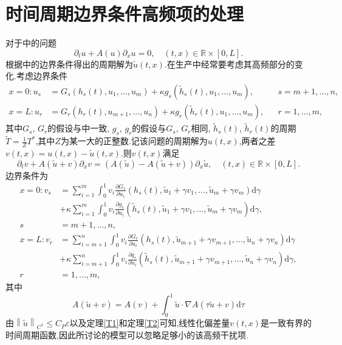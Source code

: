 \documentclass[notitlepage,cs4size,punct,oneside]{ctexrep}
\numberwithin{equation}{chapter}
\theoremstyle{mystyle}
\begin{document}
\section{时间周期边界条件高频项的处理}
对于\cite{24}中的问题
\begin{equation}
    \partial_{t} u+A(u) \partial_{x} u=0, \quad(t, x) \in \mathbb{R} \times[0, L].
\end{equation}
根据\cite{24}中的边界条件得出的周期解为$\tilde{u} (t,x)$.在生产中经常要考虑其高频部分的变化.考虑边界条件
\begin{align}
    x=0: u_{s} & =G_{s}\left(h_{s}(t), u_{1}, \ldots, u_{m}\right) + \kappa g_{s}\left(\tilde{h}_{s}(t), u_{1}, \ldots, u_{m}\right),   &  & s=m+1, \ldots, n, \\
    x=L: u_{r} & =G_{r}\left(h_{r}(t), u_{m+1}, \ldots, u_{n}\right) + \kappa g_{r}\left(\tilde{h}_{r}(t), u_{1}, \ldots, u_{m}\right), &  & r=1, \ldots, m,
\end{align}
其中$G_{s}$, $G_{r}$的假设与\cite{24}中一致, $g_{s}$, $g_{r}$的假设与$G_{s}$, $G_{r}$相同, $\tilde{h}_{s}(t)$, $\tilde{h}_{r}(t)$的周期$\tilde{T}=\frac{1}{Z} T^{*}$,其中$Z$为某一大的正整数.记该问题的周期解为$u(t,x)$,两者之差$v(t,x)=u(t,x)-\tilde{u} (t,x)$.则$v(t,x)$满足
\begin{equation}
    \partial_{t} v+A(\tilde{u}+v) \partial_{x} v=\left(A(\tilde{u})- A(\tilde{u}+v) \right) \partial_{x}  \tilde{u}, \quad(t, x) \in \mathbb{R} \times[0, L].
\end{equation}
边界条件为
\begin{align}
    x=0: v_{s} & =\sum_{i=1}^{m} \int_{0}^{1} v_{i} \frac{\partial G_{s}}{\partial u_{i}}(h_{s}(t),\tilde{u}_{1}+\gamma v_{1},\ldots ,\tilde{u}_{m}+\gamma v_{m}) \mathrm{d}\gamma \nonumber       \\& + \kappa\sum_{i=1}^{m} \int_{0}^{1} v_{i} \frac{\partial g_{s}}{\partial u_{i}}(\tilde{h}_{s}(t),\tilde{u}_{1}+\gamma v_{1},\ldots ,\tilde{u}_{m}+\gamma v_{m}) \mathrm{d}\gamma  ,\nonumber \\ s&=m+1, \ldots, n, \\
    x=L: v_{r} & =\sum_{i=m+1}^{n} \int_{0}^{1} v_{i} \frac{\partial G_{r}}{\partial u_{i}}(h_{s}(t),\tilde{u}_{m+1}+\gamma v_{m+1},\ldots ,\tilde{u}_{n}+\gamma v_{n}) \mathrm{d}\gamma \nonumber \\&+ \kappa \sum_{i=m+1}^{n} \int_{0}^{1} v_{i} \frac{\partial g_{r}}{\partial u_{i}}(\tilde{h}_{s}(t),\tilde{u}_{m+1}+\gamma v_{m+1},\ldots ,\tilde{u}_{n}+\gamma v_{n}) \mathrm{d}\gamma ,\nonumber \\r&=1, \ldots, m,
\end{align}
其中
\begin{equation}
    A(\tilde{u}+v)= A(v) + \int_{0}^{1} \tilde{u} \cdot \nabla A(\tau \tilde{u}+v) \mathrm{d}\tau
\end{equation}
由$\left\| \tilde{u} \right\|_{C^{1}} \leq C_{P} \varepsilon $以及定理\ref{T1}和定理\ref{T2}可知,线性化偏差量$v(t,x)$是一致有界的时间周期函数,因此\cite{24}所讨论的模型可以忽略足够小的该高频干扰项.
\end{document}
